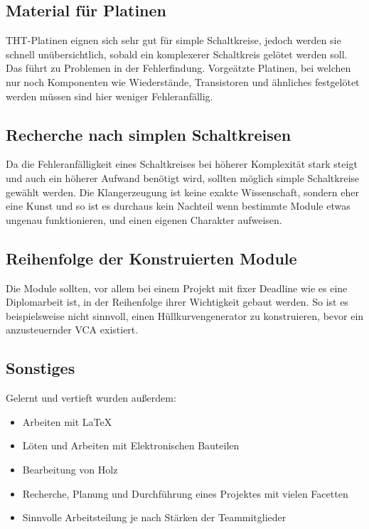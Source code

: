 \subsection{Material für Platinen}
\label{sec:org433f04e}
THT-Platinen eignen sich sehr gut für simple Schaltkreise, jedoch werden sie schnell unübersichtlich, sobald ein komplexerer Schaltkreis gelötet werden soll. Das führt zu Problemen in der Fehlerfindung. Vorgeätzte Platinen, bei welchen nur noch Komponenten wie Wiederstände, Transistoren und ähnliches festgelötet werden müssen sind hier weniger Fehleranfällig.

\subsection{Recherche nach simplen Schaltkreisen}
\label{sec:org6441fdc}
Da die Fehleranfälligkeit eines Schaltkreises bei höherer Komplexität stark steigt und auch ein höherer Aufwand benötigt wird, sollten möglich simple Schaltkreise gewählt werden. Die Klangerzeugung ist keine exakte Wissenschaft, sondern eher eine Kunst und so ist es durchaus kein Nachteil wenn bestimmte Module etwas ungenau funktionieren, und einen eigenen Charakter aufweisen.

\subsection{Reihenfolge der Konstruierten Module}
\label{sec:orgd36968a}
Die Module sollten, vor allem bei einem Projekt mit fixer Deadline wie es eine Diplomarbeit ist, in der Reihenfolge ihrer Wichtigkeit gebaut werden. So ist es beispielsweise nicht sinnvoll, einen Hüllkurvengenerator zu konstruieren, bevor ein anzusteuernder \ac{VCA} existiert.

\subsection{Sonstiges}
\label{sec:orgb6d5144}
Gelernt und vertieft wurden außerdem:
\begin{itemize}
\item Arbeiten mit \LaTeX
\item Löten und Arbeiten mit Elektronischen Bauteilen
\item Bearbeitung von Holz
\item Recherche, Planung und Durchführung eines Projektes mit vielen Facetten
\item Sinnvolle Arbeitsteilung je nach Stärken der Teammitglieder
\end{itemize}

